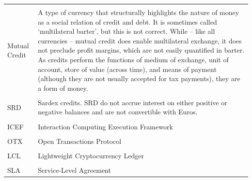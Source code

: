{\begin{longtable}[]{@{}ll@{}}
\tabularnewline\tabularnewline
\begin{minipage}[t]{0.2\columnwidth}\raggedright\strut
Mutual Credit
\strut
\end{minipage} & \begin{minipage}[t]{0.77\columnwidth}\raggedright\strut
A type of currency that structurally highlights the nature of money as a social relation of credit and debt. It is sometimes called `multilateral barter', but this is not correct. While -- like all currencies -- mutual credit does enable multilateral exchange, it does not preclude profit margins, which are not easily quantified in barter. As credits perform the functions of medium of exchange, unit of account, store of value (across time), and means of payment (although they are not usually accepted for tax payments), they are a form of money.
\strut
\end{minipage}

\tabularnewline\tabularnewline
\begin{minipage}[t]{0.2\columnwidth}\raggedright\strut
SRD
\strut
\end{minipage} & \begin{minipage}[t]{0.77\columnwidth}\raggedright\strut
Sardex credits. SRD do not accrue interest on either positive or negative balances and are not convertible with Euros.
\strut
\end{minipage}

\tabularnewline\tabularnewline
\begin{minipage}[t]{0.2\columnwidth}\raggedright\strut
ICEF
\strut
\end{minipage} & \begin{minipage}[t]{0.77\columnwidth}\raggedright\strut
Interaction Computing Execution Framework
\strut
\end{minipage}

\tabularnewline\tabularnewline
\begin{minipage}[t]{0.2\columnwidth}\raggedright\strut
OTX
\strut
\end{minipage} & \begin{minipage}[t]{0.77\columnwidth}\raggedright\strut
Open Transactions Protocol
\strut
\end{minipage}

\tabularnewline\tabularnewline
\begin{minipage}[t]{0.2\columnwidth}\raggedright\strut
LCL
\strut
\end{minipage} & \begin{minipage}[t]{0.77\columnwidth}\raggedright\strut
Lightweight Cryptocurrency Ledger
\strut
\end{minipage}

\tabularnewline\tabularnewline
\begin{minipage}[t]{0.2\columnwidth}\raggedright\strut
SLA
\strut
\end{minipage} & \begin{minipage}[t]{0.77\columnwidth}\raggedright\strut
Service-Level Agreement
\strut
\end{minipage}

\tabularnewline
\bottomrule
\end{longtable}
}
